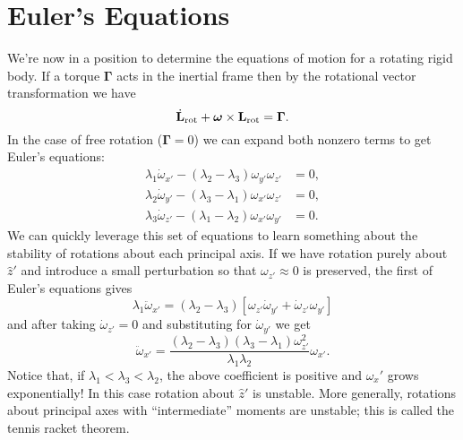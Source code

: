 \documentclass[../p111main.tex]{subfiles}
\begin{document}
\section{Euler's Equations}
We're now in a position to determine the equations of motion for a rotating rigid body.
If a torque $\bm \Gamma$ acts in the inertial frame then by the rotational vector transformation we have
\[ \dot{\mathbf{L}}_\textrm{rot} + \bm \omega \times \mathbf{L}_\textrm{rot} = \bm \Gamma. \]
In the case of free rotation ($\bm \Gamma = 0$) we can expand both nonzero terms to get Euler's equations:
\begin{align*}
    \lambda_1 \dot \omega_{x'} - (\lambda_2 - \lambda_3) \omega_{y'} \omega_{z'} &= 0, \\
    \lambda_2 \dot \omega_{y'} - (\lambda_3 - \lambda_1) \omega_{x'} \omega_{z'} &= 0, \\
    \lambda_3 \dot \omega_{z'} - (\lambda_1 - \lambda_2) \omega_{x'} \omega_{y'} &= 0.
\end{align*}
We can quickly leverage this set of equations to learn something about the stability of rotations about each principal axis.
If we have rotation purely about $\hat z'$ and introduce a small perturbation so that $\omega_{z'} \approx 0$ is preserved, the first of Euler's equations gives
\[ \lambda_1 \ddot \omega_{x'} = (\lambda_2 - \lambda_3) [\omega_{z'} \dot \omega_{y'} + \dot \omega_{z'} \omega_{y'}] \]
and after taking $\dot \omega_{z'} = 0$ and substituting for $\dot \omega_{y'}$ we get
\[ \ddot \omega_{x'} = \frac{(\lambda_2 - \lambda_3) (\lambda_3 - \lambda_1) \omega_{z'}^2}{\lambda_1 \lambda_2} \omega_{x'}. \]
Notice that, if $\lambda_1 < \lambda_3 < \lambda_2$, the above coefficient is positive and $\omega_x'$ grows exponentially!
In this case rotation about $\hat z'$ is unstable.
More generally, rotations about principal axes with ``intermediate'' moments are unstable; this is called the tennis racket theorem.
\end{document}
